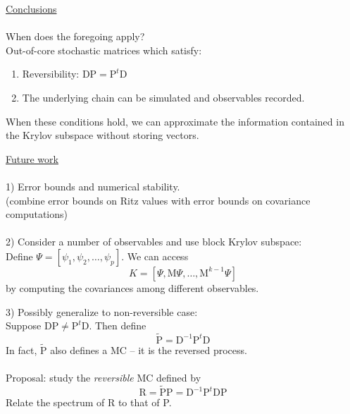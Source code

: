 \documentclass{slides}
\newcommand{\M}{\mbox{M}}
\newcommand{\D}{\mbox{D}}
\newcommand{\Prob}{\mbox{P}}
\newcommand{\R}{\mbox{R}}
\begin{document}
\begin{slide}
\underline{Conclusions}\\\\
When does the foregoing apply?\\
Out-of-core stochastic matrices which satisfy:
\begin{enumerate}
\item Reversibility: $\D \Prob = \Prob^t \D$
\item The underlying chain can be simulated and observables recorded.
\end{enumerate}
When these conditions hold, we can approximate the information 
contained in the Krylov subspace without storing vectors.
\end{slide}

\begin{slide}
\underline{Future work}
\\\\
1) Error bounds and numerical stability.  \\
(combine error bounds on Ritz values with error bounds on covariance
computations)
\\\\
2) Consider a number of observables and use block Krylov subspace:\\
Define $\Psi = [\psi_1, \psi_2, \ldots, \psi_p]$.  We can access
\[K = \left[\Psi, \M \Psi, \ldots, \M^{k-1}\Psi\right]\]
by computing the covariances among different observables.
\end{slide}

\begin{slide}
3) Possibly generalize to non-reversible case:\\
Suppose $\D\Prob \neq \Prob^t\D$.  Then define 
\[\tilde{\Prob} = \D^{-1} \Prob^t\D\]  
In fact, $\tilde{\Prob}$ also defines a MC -- it is the reversed
process.
\\\\
Proposal: study the \emph{reversible} MC defined by
\[\R = \tilde{ \Prob} \Prob = \D^{-1} \Prob^t\D \Prob \]
Relate the spectrum of R to that of P.
\end{slide}
\end{document}
